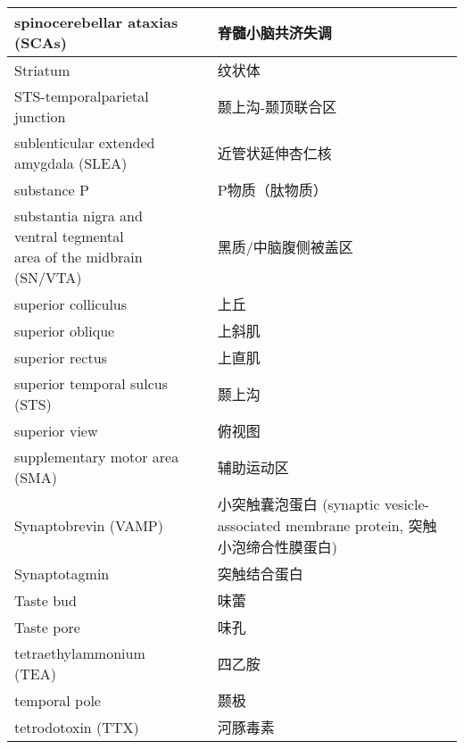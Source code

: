 \begin{longtable}{lll}
	\midrule
	spinocerebellar ataxias (SCAs)   && 脊髓小脑共济失调 \\
	
	\midrule
	Striatum   && 纹状体 \\
	
	\midrule
	STS-temporalparietal junction   && 颞上沟-颞顶联合区 \\
	
	\midrule
	sublenticular extended amygdala (SLEA)   && 近管状延伸杏仁核 \\
	
	\midrule
	substance P   && P物质（肽物质） \\
	
	\midrule
	\makecell{substantia nigra and ventral tegmental \\area of the midbrain (SN/VTA)}   && 黑质/中脑腹侧被盖区 \\
	
	\midrule
	superior colliculus   && 上丘 \\
	
	\midrule
	superior oblique   && 上斜肌 \\
	
	\midrule
	superior rectus   && 上直肌 \\
	
	\midrule
	superior temporal sulcus (STS)   && 颞上沟 \\
	
	\midrule
	superior view   && 俯视图 \\
	
	\midrule
	supplementary motor area (SMA)   && 辅助运动区 \\
	
	\midrule
	Synaptobrevin (VAMP)   && 小突触囊泡蛋白 (synaptic vesicle-associated membrane protein, 突触小泡缔合性膜蛋白) \\
	
	\midrule
	Synaptotagmin   && 突触结合蛋白 \\
	
	\midrule
	Taste bud   && 	味蕾  \\
	
	\midrule
	Taste pore   && 	味孔  \\
	
	\midrule
	tetraethylammonium (TEA)   && 四乙胺  \\
	
	\midrule
	temporal pole   && 颞极  \\
	
	\midrule
	tetrodotoxin (TTX)   && 河豚毒素  \\
	

\end{longtable}
